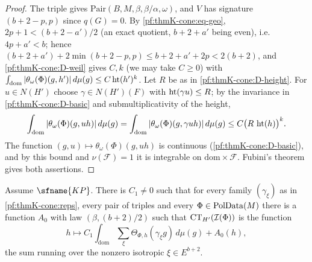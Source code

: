 \begin{proof}
The triple gives $\mathrm{Pair}(B,M,\beta,\beta/\alpha,\omega)$, and $V$ has signature $(b+2-p,p)$ since $q(G)=0$.  By
\eqref{pf:thmK-cone:eq-geo}, $2p+1<(b+2-a')/2$ (an exact quotient, $b+2+a'$ being even), i.e.\ $4p+a'<b$; hence
$(b+2+a')+2\min(b+2-p,p)\le b+2+a'+2p<2(b+2)$, and \ref{pf:thmK-cone:D-weil} gives $C,k$ (we may take $C\ge0$) with
$\int_{\mathrm{dom}}|\theta_\omega(\Phi)(g,h')|\,d\mu(g)\le C\operatorname{ht}(h')^k$.  Let $R$ be as in
\ref{pf:thmK-cone:D-height}.  For $u\in N(H')$ choose $\gamma\in N(H')(F)$ with $\operatorname{ht}(\gamma u)\le R$; by the
invariance in \ref{pf:thmK-cone:D-basic} and submultiplicativity of the height,
\[
  \int_{\mathrm{dom}}|\theta_\omega(\Phi)(g,uh)|\,d\mu(g)=\int_{\mathrm{dom}}|\theta_\omega(\Phi)(g,\gamma uh)|\,d\mu(g)
  \le C\bigl(R\,\operatorname{ht}(h)\bigr)^k .
\]
The function $(g,u)\mapsto\theta_\omega(\Phi)(g,uh)$ is continuous (\ref{pf:thmK-cone:D-basic}), and by this bound and
$\nu(\mathcal F)=1$ it is integrable on $\mathrm{dom}\times\mathcal F$.  Fubini's theorem gives both assertions.
\end{proof}

\begin{lemma}\label{pf:thmK-cone:ctbig}
Assume $\sfname{KP}$.  There is $C_1\neq0$ such that for every family $(\gamma_\xi)$ as in \cref{pf:thmK-cone:reps},
every pair of triples and every $\Phi\in\operatorname{PolData}(M)$ there is a function $A_0$ with law $(\beta,(b+2)/2)$ such that
$\mathrm{CT}_{H'}(\mathcal{I}(\Phi))$ is the function
\[
  h\longmapsto C_1\int_{\mathrm{dom}}\sum_{\xi}\Theta_{\Phi,h}(\gamma_\xi g)\,d\mu(g)+A_0(h),
\]
the sum running over the nonzero isotropic $\xi\in E^{b+2}$.
\end{lemma}

